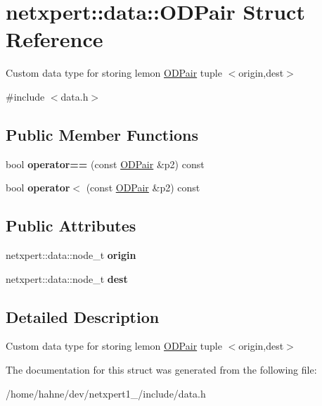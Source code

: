 \hypertarget{structnetxpert_1_1data_1_1ODPair}{}\section{netxpert\+:\+:data\+:\+:O\+D\+Pair Struct Reference}
\label{structnetxpert_1_1data_1_1ODPair}


Custom data type for storing lemon \hyperlink{structnetxpert_1_1data_1_1ODPair}{O\+D\+Pair} tuple $<$origin,dest$>$  




{\ttfamily \#include $<$data.\+h$>$}

\subsection*{Public Member Functions}
\begin{DoxyCompactItemize}
\item 
bool {\bfseries operator==} (const \hyperlink{structnetxpert_1_1data_1_1ODPair}{O\+D\+Pair} \&p2) const \hypertarget{structnetxpert_1_1data_1_1ODPair_a4d240c740c3710d9529e714df658ae53}{}\label{structnetxpert_1_1data_1_1ODPair_a4d240c740c3710d9529e714df658ae53}

\item 
bool {\bfseries operator$<$} (const \hyperlink{structnetxpert_1_1data_1_1ODPair}{O\+D\+Pair} \&p2) const \hypertarget{structnetxpert_1_1data_1_1ODPair_afd53307442216ae9a1b1cb5359a107a7}{}\label{structnetxpert_1_1data_1_1ODPair_afd53307442216ae9a1b1cb5359a107a7}

\end{DoxyCompactItemize}
\subsection*{Public Attributes}
\begin{DoxyCompactItemize}
\item 
netxpert\+::data\+::node\+\_\+t {\bfseries origin}\hypertarget{structnetxpert_1_1data_1_1ODPair_a557a8b00799f18a5df315e15f0f8ccb9}{}\label{structnetxpert_1_1data_1_1ODPair_a557a8b00799f18a5df315e15f0f8ccb9}

\item 
netxpert\+::data\+::node\+\_\+t {\bfseries dest}\hypertarget{structnetxpert_1_1data_1_1ODPair_aa1674cccee6cf54f23192cd290ce22a1}{}\label{structnetxpert_1_1data_1_1ODPair_aa1674cccee6cf54f23192cd290ce22a1}

\end{DoxyCompactItemize}


\subsection{Detailed Description}
Custom data type for storing lemon \hyperlink{structnetxpert_1_1data_1_1ODPair}{O\+D\+Pair} tuple $<$origin,dest$>$ 

The documentation for this struct was generated from the following file\+:\begin{DoxyCompactItemize}
\item 
/home/hahne/dev/netxpert1\+\_/include/data.\+h\end{DoxyCompactItemize}
